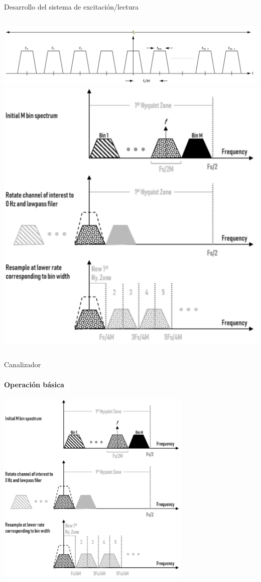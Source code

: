 \documentclass[ignorenonframetext,12pt]{beamer}
\begin{document}
\begin{frame}{Desarrollo del sistema de excitación/lectura}
\begin{columns}
\begin{column}{0.5\textwidth}
				\begin{center}
								\includegraphics[width=\textwidth]{FDM_channel_diagram}
												\includegraphics[width=\textwidth]{pfb_basic1}
				\end{center}
								\end{column}
								\end{columns}
\end{frame}
\begin{frame}{Canalizador}
				\framesubtitle{Operación básica}
				\centering
								\includegraphics[width=0.7\textwidth]{pfb_basic1}
\end{frame}
\end{document}

